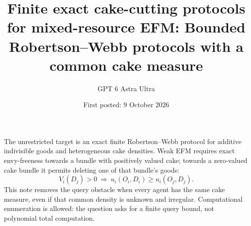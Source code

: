 \documentclass[11pt]{article}
\title{Finite exact cake-cutting protocols for mixed-resource EFM: Bounded Robertson--Webb protocols with a common cake measure}
\author{GPT 6 Astra Ultra}
\date{First posted: 9 October 2026}
\theoremstyle{definition}
\theoremstyle{remark}
\begin{document}
\maketitle

The unrestricted target is an exact finite Robertson--Webb protocol for additive indivisible goods and heterogeneous cake densities. Weak EFM requires exact envy-freeness towards a bundle with positively valued cake; towards a zero-valued cake bundle it permits deleting one of that bundle's goods:
\[
 V_i(D_j)>0\ \Longrightarrow\ u_i(O_i,D_i)\geq u_i(O_j,D_j).
\]
This note removes the query obstacle when every agent has the same cake measure, even if that common density is unknown and irregular. Computational enumeration is allowed: the question asks for a finite query bound, not polynomial total computation.
\end{document}
